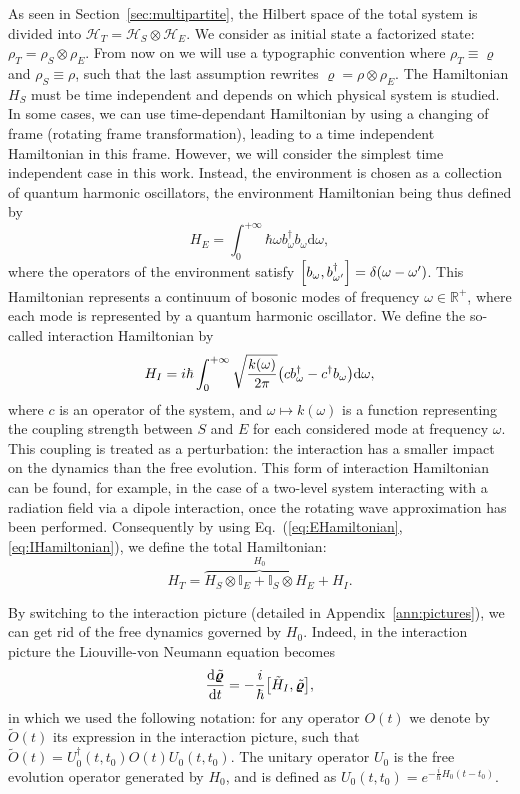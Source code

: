 As seen in Section~\ref{sec:multipartite}, the Hilbert space of the total system is divided into $\mathcal{H}_T=\mathcal{H}_S\otimes\mathcal{H}_E$. We consider as initial state a factorized state: $\rho_T=\rho_S\otimes\rho_E$. From now on we will use a typographic convention where $\rho_T\equiv\bm{\varrho}$ and $\rho_S\equiv\rho$, such that the last assumption rewrites $\bm{\varrho}=\rho\otimes\rho_E$. The Hamiltonian $H_S$ must be time independent and depends on which physical system is studied. In some cases, we can use time-dependant Hamiltonian by using a changing of frame (rotating frame transformation), leading to a time independent Hamiltonian in this frame. However, we will consider the simplest time independent case in this work. Instead, the environment is chosen as a collection of quantum harmonic oscillators, the environment Hamiltonian being thus defined by
\begin{equation}\label{eq:EHamiltonian}
    H_E=\int_0^{+\infty} \hbar\omega b^\dagger_\omega b_\omega\mathrm{d}\omega,
\end{equation}
where the operators of the environment satisfy $\qty[b_\omega, b_{\omega'}^\dagger]=\delta(\omega-\omega')$. This Hamiltonian represents a continuum of bosonic modes of frequency $\omega\in\mathbb{R}^+$, where each mode is represented by a quantum harmonic oscillator. We define the so-called interaction Hamiltonian by
\begin{equation}\label{eq:IHamiltonian}
    H_I = i\hbar\int_0^{+\infty} \sqrt{\frac{k(\omega)}{2\pi}} \qty(c b_\omega^\dagger - c^\dagger b_\omega) \mathrm{d}\omega,
\end{equation}
where $c$ is an operator of the system, and $\omega\mapsto k(\omega)$ is a function representing the coupling strength between $S$ and $E$ for each considered mode at frequency $\omega$. This coupling is treated as a perturbation: the interaction has a smaller impact on the dynamics than the free evolution. This form of interaction Hamiltonian can be found, for example, in the case of a two-level system interacting with a radiation field via a dipole interaction, once the rotating wave approximation has been performed. Consequently by using Eq.~(\ref{eq:EHamiltonian},\ref{eq:IHamiltonian}), we define the total Hamiltonian:
\begin{equation}
    H_T = \overbrace{H_S\otimes\mathbb{I}_E+ \mathbb{I}_S\otimes H_E}^{H_0} + H_I.
\end{equation}

By switching to the interaction picture (detailed in Appendix~\ref{ann:pictures}), we can get rid of the free dynamics governed by $H_0$. Indeed, in the interaction picture the Liouville-von Neumann equation becomes
\begin{equation}
    \frac{\mathrm{d}\tilde{\bm{\varrho}}}{\mathrm{d}t}=-\frac{i}{\hbar}\qty[\tilde{H}_I,\tilde{\bm{\varrho}}],
\end{equation}
in which we used the following notation: for any operator $O(t)$ we denote by $\tilde{O}(t)$ its expression in the interaction picture, such that $\tilde{O}(t)=U_0^\dagger(t,t_0)O(t)U_0(t,t_0)$. The unitary operator $U_0$ is the free evolution operator generated by $H_0$, and is defined as $U_0(t,t_0)=e^{-\frac{i}{\hbar}H_0 (t-t_0)}$.

